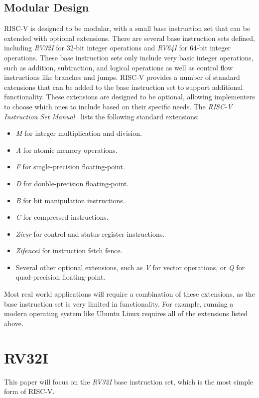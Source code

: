 \documentclass[sigconf]{acmart}
\begin{document}
\subsection{Modular Design}\label{sec:modular-design}
RISC-V is designed to be modular, with a small base instruction set that can be extended with optional extensions.
There are several base instruction sets defined, including \textit{RV32I} for 32-bit integer operations and \textit{RV64I} for 64-bit integer operations.
These base instruction sets only include very basic integer operations, such as addition, subtraction, and logical operations as well as control flow instructions like branches and jumps.
RISC-V provides a number of standard extensions that can be added to the base instruction set to support additional functionality. These extensions are designed to be optional, allowing implementers to choose which ones to include based on their specific needs. The \textit{RISC-V Instruction Set Manual}~\cite{riscv-spec} lists the following standard extensions:
\begin{itemize}
    \item \textit{M} for integer multiplication and division.
    \item \textit{A} for atomic memory operations.
    \item \textit{F} for single-precision floating-point.
    \item \textit{D} for double-precision floating-point.
    \item \textit{B} for bit manipulation instructions.
    \item \textit{C} for compressed instructions.
    \item \textit{Zicsr} for control and status register instructions.
    \item \textit{Zifencei} for instruction fetch fence.
    \item Several other optional extensions, such as \textit{V} for vector operations, or \textit{Q} for quad-precision floating-point.
\end{itemize}
Most real world applications will require a combination of these extensions, as the base instruction set is very limited in functionality.
For example, running a modern operating system like Ubuntu Linux requires all of the extensions listed above.

\section{RV32I}
This paper will focus on the \textit{RV32I} base instruction set, which is the most simple form of RISC-V.
\end{document}
